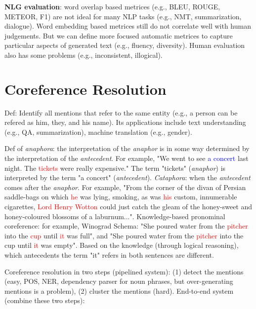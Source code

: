 \textbf{NLG evaluation}: word overlap based metrices (e.g., BLEU, ROUGE, METEOR, F1) are not ideal for many NLP tasks (e.g., NMT, summarization, dialogue).
Word embedding based metrices still do not correlate well with human judgements.
But we can define more focused automatic metrices to capture particular aspects of generated text (e.g., fluency, diversity).
Human evaluation also has some problems (e.g., inconsistent, illogical).

\section{Coreference Resolution}

Def: Identify all mentions that refer to the same entity (e.g., a person can be refered as him, they, and his name).
Its applications include text understanding (e.g., QA, summarization), machine translation (e.g., gender).

Def of \textit{anaphora}: the interpretation of the \textit{anaphor} is in some way determined by the interpretation of the \textit{antecedent}.
For example, "We went to see \textcolor{blue}{a concert} last night. The \textcolor{red}{tickets} were really expensive." The term "tickets" (\textit{anaphor}) is interpreted by the term "a concert" (\textit{antecedent}).
\textit{Cataphora}: when the \textit{antecedent} comes after the \textit{anaphor}.
For example, "From the corner of the divan of Persian saddle-bags on which \textcolor{red}{he} was lying, smoking, as was \textcolor{red}{his} custom, innumerable cigarettes, \textcolor{red}{Lord Henry Wotton} could just catch the gleam of the honey-sweet and honey-coloured blossoms of a laburnum...".
Knowledge-based pronominal coreference: for example, Winograd Schema: "She poured water from the \textcolor{red}{pitcher} into the \textcolor{red}{cup} until \textcolor{red}{it} was full", and "She poured water from the \textcolor{red}{pitcher} into the cup until \textcolor{red}{it} was empty".
Based on the knowledge (through logical reasoning), which antecedents the term "it" refers in both sentences are different.

Coreference resolution in two steps (pipelined system): (1) detect the mentions (easy, POS, NER, dependency parser for noun phrases, but over-generating mentions is a problem), (2) cluster the mentions (hard).
End-to-end system (combine these two steps): 
